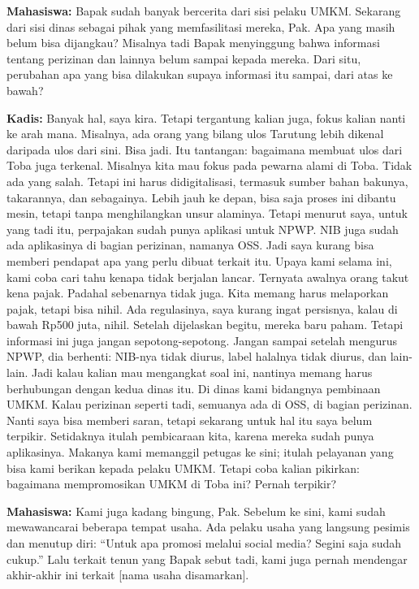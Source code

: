 {\noindent \textbf{Mahasiswa:} Bapak sudah banyak bercerita dari sisi pelaku UMKM. Sekarang dari sisi dinas sebagai pihak yang memfasilitasi mereka, Pak. Apa yang masih belum bisa dijangkau? Misalnya tadi Bapak menyinggung bahwa informasi tentang perizinan dan lainnya belum sampai kepada mereka. Dari situ, perubahan apa yang bisa dilakukan supaya informasi itu sampai, dari atas ke bawah?

\noindent \textbf{Kadis:} Banyak hal, saya kira. Tetapi tergantung kalian juga, fokus kalian nanti ke arah mana. Misalnya, ada orang yang bilang ulos Tarutung lebih dikenal daripada ulos dari sini. Bisa jadi. Itu tantangan: bagaimana membuat ulos dari Toba juga terkenal. Misalnya kita mau fokus pada pewarna alami di Toba. Tidak ada yang salah. Tetapi ini harus didigitalisasi, termasuk sumber bahan bakunya, takarannya, dan sebagainya. Lebih jauh ke depan, bisa saja proses ini dibantu mesin, tetapi tanpa menghilangkan unsur alaminya. Tetapi menurut saya, untuk yang tadi itu, perpajakan sudah punya aplikasi untuk NPWP. NIB juga sudah ada aplikasinya di bagian perizinan, namanya OSS. Jadi saya kurang bisa memberi pendapat apa yang perlu dibuat terkait itu. Upaya kami selama ini, kami coba cari tahu kenapa tidak berjalan lancar. Ternyata awalnya orang takut kena pajak. Padahal sebenarnya tidak juga. Kita memang harus melaporkan pajak, tetapi bisa nihil. Ada regulasinya, saya kurang ingat persisnya, kalau di bawah Rp500 juta, nihil. Setelah dijelaskan begitu, mereka baru paham. Tetapi informasi ini juga jangan sepotong-sepotong. Jangan sampai setelah mengurus NPWP, dia berhenti: NIB-nya tidak diurus, label halalnya tidak diurus, dan lain-lain. Jadi kalau kalian mau mengangkat soal ini, nantinya memang harus berhubungan dengan kedua dinas itu. Di dinas kami bidangnya pembinaan UMKM. Kalau perizinan seperti tadi, semuanya ada di OSS, di bagian perizinan. Nanti saya bisa memberi saran, tetapi sekarang untuk hal itu saya belum terpikir. Setidaknya itulah pembicaraan kita, karena mereka sudah punya aplikasinya. Makanya kami memanggil petugas ke sini; itulah pelayanan yang bisa kami berikan kepada pelaku UMKM. Tetapi coba kalian pikirkan: bagaimana mempromosikan UMKM di Toba ini? Pernah terpikir?

\noindent \textbf{Mahasiswa:} Kami juga kadang bingung, Pak. Sebelum ke sini, kami sudah mewawancarai beberapa tempat usaha. Ada pelaku usaha yang langsung pesimis dan menutup diri: ``Untuk apa promosi melalui social media? Segini saja sudah cukup.'' Lalu terkait tenun yang Bapak sebut tadi, kami juga pernah mendengar akhir-akhir ini terkait [nama usaha disamarkan].

}
